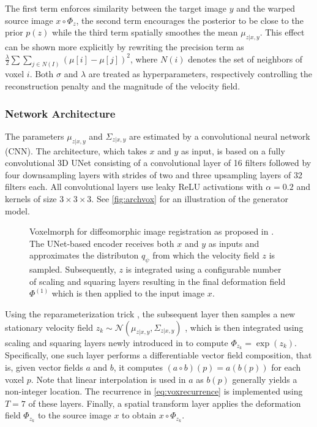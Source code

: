 The first term enforces similarity between the target image $y$ and the warped source image $x \circ \Phi_z$, the second term encourages the posterior to be close to the prior $p(z)$ while the third term spatially smoothes the mean $\mu_{z | x, y}$. This effect can be shown more explicitly by rewriting the precision term as $ { \frac{\lambda}{2} \sum \sum_{j \in N(I)} ( \mu[i] - \mu[j])^{2} } $, where $N(i)$ denotes the set of neighbors of voxel $i$. Both $\sigma$ and $\lambda$ are treated as hyperparameters, respectively controlling the reconstruction penalty and the magnitude of the velocity field.

\subsubsection*{Network Architecture}
The parameters $\mu_{z | x, y}$ and $\Sigma_{z | x, y}$ are estimated by a convolutional neural network (CNN). The architecture, which takes $x$ and $y$ as input, is based on a fully convolutional 3D UNet consisting of a convolutional layer of 16 filters followed by four downsampling layers with strides of two and three upsampling layers of 32 filters each. All convolutional layers use leaky ReLU activations with $\alpha = 0.2$ and kernels of size $3\times3\times3$. See \autoref{fig:archvox} for an illustration of the generator model.

\begin{figure}
	\centering
	
	\caption{Voxelmorph for diffeomorphic image registration as proposed in \cite{dalca2018unsupervised}. The UNet-based encoder receives both $x$ and $y$ as inputs and approximates the distributon $q_\psi$ from which the velocity field $z$ is sampled. Subsequently, $z$ is integrated using a configurable number of scaling and squaring layers resulting in the final deformation field $\Phi^{(1)}$ which is then applied to the input image $x$.}
	\label{fig:archvox}
\end{figure}

Using the reparameterization trick \cite{kingma2013auto}, the subsequent layer then samples a new stationary velocity field $ { z_k \sim \mathcal{N}(\mu_{z | x, y}, \Sigma_{z | x, y}) } $ , which is then integrated using scaling and squaring layers newly introduced in \cite{dalca2018unsupervised} to compute $\Phi_{z_k} = \exp(z_k)$. Specifically, one such layer performs a differentiable vector field composition, that is, given vector fields $a$ and $b$, it computes $(a \circ b)(p) = a(b(p))$ for each voxel $p$. Note that linear interpolation is used in $a$ as $b(p)$ generally yields a non-integer location. The recurrence in \autoref{eq:voxrecurrence} is implemented using $T = 7$ of these layers. Finally, a spatial transform layer applies the deformation field $\Phi_{z_k}$ to the source image $x$ to obtain $x \circ \Phi_{z_k}$.


